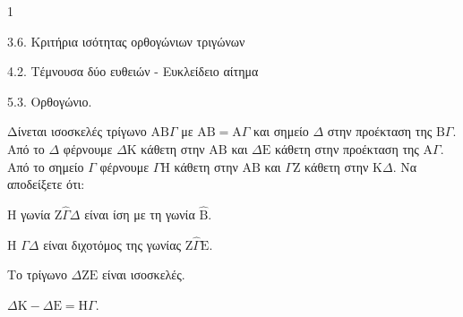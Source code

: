 \begin{ylh}{1}
    \item 3.6. Κριτήρια ισότητας ορθογώνιων τριγώνων
    \item 4.2. Τέμνουσα δύο ευθειών - Ευκλείδειο αίτημα
    \item 5.3. Ορθογώνιο.
\end{ylh}
Δίνεται ισοσκελές τρίγωνο $\mathrm{A}\mathrm{B}\Gamma$ με $\mathrm{A}\mathrm{B} = \mathrm{A}\Gamma$ και σημείο $\Delta$ στην προέκταση της $\mathrm{B}\Gamma$. Από το $\Delta$ φέρνουμε $\Delta\mathrm{K}$ κάθετη στην $\mathrm{A}\mathrm{B}$ και $\Delta\mathrm{E}$ κάθετη στην προέκταση της $\mathrm{A}\Gamma$. Από το σημείο $\Gamma$ φέρνουμε $\Gamma\mathrm{H}$ κάθετη στην $\mathrm{A}\mathrm{B}$ και $\Gamma\mathrm{Z}$ κάθετη στην $\mathrm{K}\Delta$.
Να αποδείξετε ότι:
\begin{alist}
    \item H γωνία $\mathrm{Z}\hat{\Gamma}\Delta$ είναι ίση με τη γωνία $\hat{\mathrm{B}}$. 
    \item Η $\Gamma\Delta$ είναι διχοτόμος της γωνίας $\mathrm{Z}\hat{\Gamma}\mathrm{E}$. 
    \item Το τρίγωνο $\Delta\mathrm{Z}\mathrm{E}$ είναι ισοσκελές. 
    \item $\Delta\mathrm{K} - \Delta\mathrm{E} = \mathrm{H}\Gamma$. 
\end{alist}
